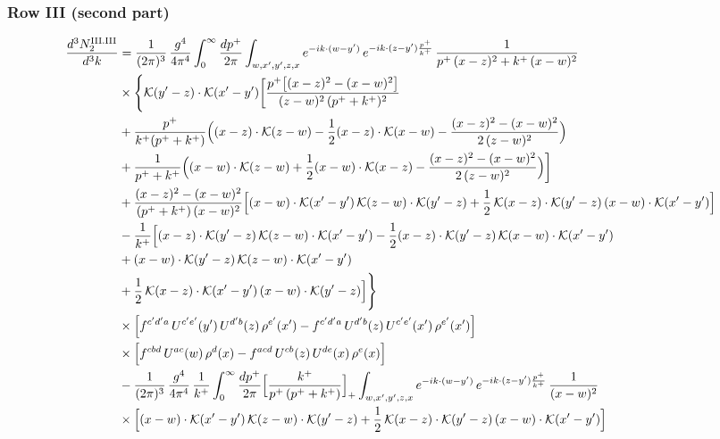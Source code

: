 \documentclass[9pt]{article}
\numberwithin{equation}{section}
\begin{document}
\subsubsection*{Row III (second part)}
\begin{align}
\frac{d^{3}N^{\rm III.III}_{2}}{d^{3}k} & =\frac{1}{(2\pi)^{3}}\,\frac{g^{4}}{4\pi^{4}}\int_{0}^{\infty}\frac{dp^{+}}{2\pi}\int_{w,x',y',z,x}e^{-ik\cdot(w-y')}\,e^{-ik\cdot(z-y')\frac{p^{+}}{k^{+}}}\,\frac{1}{p^{+}\,(x-z)^{2}+k^{+}\,(x-w)^{2}}\notag\\
&\times\Bigg\{\mathcal{K}(y'-z)\cdot\mathcal{K}(x'-y')\bigg[\frac{p^{+}\big[(x-z)^{2}-(x-w)^{2}\big]}{(z-w)^{2}\,(p^{+}+k^{+})^{2}}\notag\\
&+\frac{p^{+}}{k^{+}(p^{+}+k^{+})}\Big((x-z)\cdot\mathcal{K}(z-w)-\frac{1}{2}(x-z)\cdot\mathcal{K}(x-w)-\frac{(x-z)^{2}-(x-w)^{2}}{2\,(z-w)^{2}}\Big)\notag\\
&+\frac{1}{p^{+}+k^{+}}\Big((x-w)\cdot\mathcal{K}(z-w)+\frac{1}{2}(x-w)\cdot\mathcal{K}(x-z)-\frac{(x-z)^{2}-(x-w)^{2}}{2\,(z-w)^{2}}\Big)\bigg]\notag\\
&+\frac{(x-z)^{2}-(x-w)^{2}}{(p^{+}+k^{+})\,(x-w)^{2}}\Big[(x-w)\cdot\mathcal{K}(x'-y')\,\mathcal{K}(z-w)\cdot\mathcal{K}(y'-z)+\frac{1}{2}\,\mathcal{K}(x-z)\cdot\mathcal{K}(y'-z)\,(x-w)\cdot\mathcal{K}(x'-y')\Big]\notag\\
&-\frac{1}{k^{+}}\Big[(x-z)\cdot\mathcal{K}(y'-z)\,\mathcal{K}(z-w)\cdot\mathcal{K}(x'-y')-\frac{1}{2}(x-z)\cdot\mathcal{K}(y'-z)\,\mathcal{K}(x-w)\cdot\mathcal{K}(x'-y')\notag\\
&+(x-w)\cdot\mathcal{K}(y'-z)\,\mathcal{K}(z-w)\cdot\mathcal{K}(x'-y')\notag\\
&+\frac{1}{2}\,\mathcal{K}(x-z)\cdot\mathcal{K}(x'-y')\,(x-w)\cdot\mathcal{K}(y'-z)\Big]\Bigg\}\notag\\
&\times\Big[f^{c'd'a}\,U^{c'e'}(y')\,U^{d'b}(z)\,\rho^{e'}(x')-f^{c'd'a}\,U^{d'b}(z)\,U^{c'e'}(x')\,\rho^{e'}(x')\Big]\notag\\
&\times\Big[f^{cbd}\,U^{ac}(w)\,\rho^{d}(x)-f^{acd}\,U^{cb}(z)\,U^{de}(x)\,\rho^{e}(x)\Big]\notag\\
&-\frac{1}{(2\pi)^{3}}\,\frac{g^{4}}{4\pi^{4}}\,\frac{1}{k^{+}}\int_{0}^{\infty}\frac{dp^{+}}{2\pi}\Big[\frac{k^{+}}{p^{+}\,(p^{+}+k^{+})}\Big]_{+}\int_{w,x',y',z,x}e^{-ik\cdot(w-y')}\,e^{-ik\cdot(z-y')\frac{p^{+}}{k^{+}}}\,\frac{1}{(x-w)^{2}}\notag\\
&\times\Big[(x-w)\cdot\mathcal{K}(x'-y')\,\mathcal{K}(z-w)\cdot\mathcal{K}(y'-z)+\frac{1}{2}\,\mathcal{K}(x-z)\cdot\mathcal{K}(y'-z)\,(x-w)\cdot\mathcal{K}(x'-y')\Big]\notag\\

\end{align}
\end{document}
